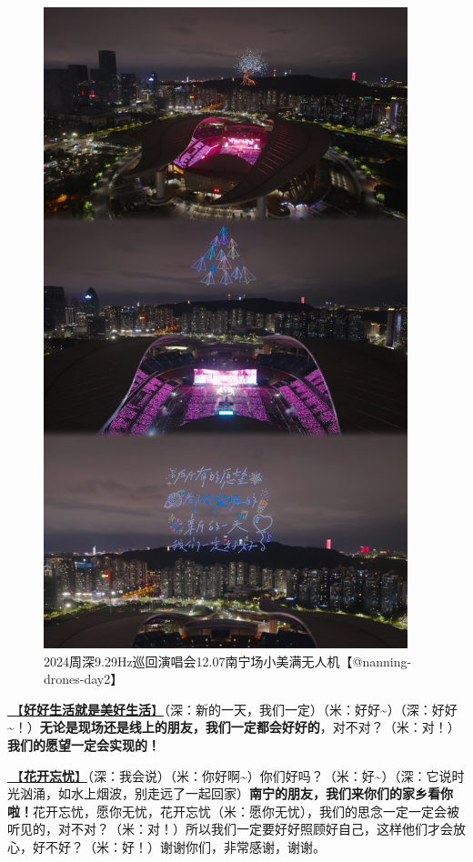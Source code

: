 \documentclass[]{ctexbook}
\begin{document}
\begin{figure}

{\centering \includegraphics[width=300pt]{img/nanning20241207/001} 

}

\caption{2024周深9.29Hz巡回演唱会12.07南宁场小美满无人机【@nanning-drones-day2】}\label{fig:unnamed-chunk-163}
\end{figure}

\hyperref[live-happy-life-happy]{🎵【\textbf{好好生活就是美好生活}】}（深：新的一天，我们一定）（米：好好\textasciitilde）（深：好好\textasciitilde！）\textbf{无论是现场还是线上的朋友，我们一定都会好好的}，对不对？（米：对！）\textbf{我们的愿望一定会实现的！}

\hyperref[no-worries]{🎵【\textbf{花开忘忧}】}（深：我会说）（米：你好啊\textasciitilde）你们好吗？（米：好\textasciitilde）（深：它说时光汹涌，如水上烟波，别走远了一起回家）\textbf{南宁的朋友，我们来你们的家乡看你啦！}花开忘忧，愿你无忧，花开忘忧（米：愿你无忧），我们的思念一定一定会被听见的，对不对？（米：对！）所以我们一定要好好照顾好自己，这样他们才会放心，好不好？（米：好！）谢谢你们，非常感谢，谢谢。
\end{document}
